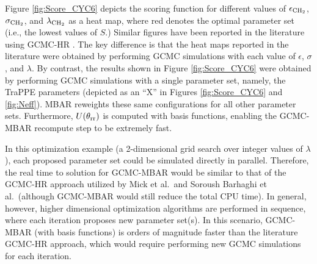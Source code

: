 \documentclass[journal=jced,manuscript=article]{achemso}
\begin{document}
Figure \ref{fig:Score_CYC6} depicts the scoring function for different values of $\epsilon_{\rm CH_2}$, $\sigma_{\rm CH_2}$, and $\lambda_{\rm CH_2}$ as a heat map, where red denotes the optimal parameter set (i.e., the lowest values of $S$.) Similar figures have been reported in the literature using GCMC-HR \cite{Potoff_branched,Barhaghi2017}. The key difference is that the heat maps reported in the literature were obtained by performing GCMC simulations with each value of $\epsilon$, $\sigma$, and $\lambda$. By contrast, the results shown in Figure \ref{fig:Score_CYC6} were obtained by performing GCMC simulations with a single parameter set, namely, the TraPPE parameters (depicted as an ``X'' in Figures \ref{fig:Score_CYC6} and \ref{fig:Neff}). MBAR reweights these same configurations for all other parameter sets. Furthermore, $U(\theta_{\rm rr})$ is computed with basis functions, enabling the GCMC-MBAR recompute step to be extremely fast. 

In this optimization example (a 2-dimensional grid search over integer values of $\lambda$), each proposed parameter set could be simulated directly in parallel. Therefore, the real time to solution for GCMC-MBAR would be similar to that of the GCMC-HR approach utilized by Mick et al.~and Soroush Barhaghi et al.~(although GCMC-MBAR would still reduce the total CPU time). In general, however, higher dimensional optimization algorithms are performed in sequence, where each iteration proposes new parameter set(s). In this scenario, GCMC-MBAR (with basis functions) is orders of magnitude faster than the literature GCMC-HR approach, which would require performing new GCMC simulations for each iteration. 


\end{document}
